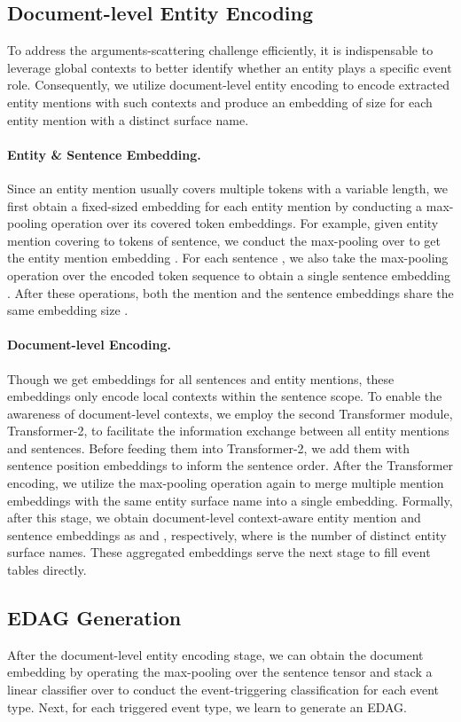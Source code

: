 \documentclass[11pt,a4paper]{article}
\begin{document}
\subsection{Document-level Entity Encoding}
\label{sec:doc_ent_enc}
To address the arguments-scattering challenge efficiently,
it is indispensable to leverage global contexts to better identify whether an entity plays a specific event role.
Consequently, we utilize document-level entity encoding to encode extracted entity mentions with such contexts and produce an embedding of size  for each entity mention with a distinct surface name.

\paragraph{Entity \& Sentence Embedding.}
Since an entity mention usually covers multiple tokens with a variable length,
we first obtain a fixed-sized embedding for each entity mention by conducting a max-pooling operation over its covered token embeddings.
For example, given  entity mention covering  to  tokens of  sentence, we conduct the max-pooling over  to get the entity mention embedding .
For each sentence , we also take the max-pooling operation over the encoded token sequence  to obtain a single sentence embedding .
After these operations, both the mention and the sentence embeddings share the same embedding size .

\paragraph{Document-level Encoding.}
Though we get embeddings for all sentences and entity mentions, these embeddings only encode local contexts within the sentence scope.
To enable the awareness of document-level contexts, we employ the second Transformer module, Transformer-2, to facilitate the information exchange between all entity mentions and sentences.
Before feeding them into Transformer-2, we add them with sentence position embeddings to inform the sentence order.
After the Transformer encoding, we utilize the max-pooling operation again to merge multiple mention embeddings with the same entity surface name into a single embedding.
Formally, after this stage, we obtain document-level context-aware entity mention and sentence embeddings as
 and , respectively,
where  is the number of distinct entity surface names.
These aggregated embeddings serve the next stage to fill event tables directly.

\subsection{EDAG Generation}
\label{sec:dag_gen}
After the document-level entity encoding stage, we can obtain the document embedding  by operating the max-pooling over the sentence tensor  and stack a linear classifier over  to conduct the event-triggering classification for each event type.
Next, for each triggered event type, we learn to generate an EDAG.
\end{document}
